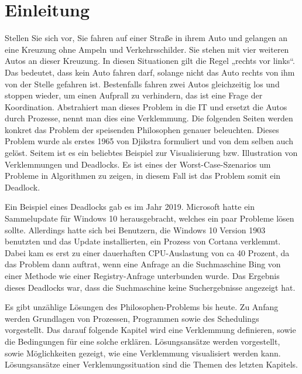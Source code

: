 \chapter{Einleitung}
\label{sec:Einleitung}
Stellen Sie sich vor, Sie fahren auf einer Straße in ihrem Auto und gelangen an eine Kreuzung ohne Ampeln und Verkehrsschilder. Sie stehen mit vier weiteren Autos an dieser Kreuzung. In diesen Situationen gilt die Regel „rechts vor links“. Das bedeutet, dass kein Auto fahren darf, solange nicht das Auto rechts von ihm von der Stelle gefahren ist. Bestenfalls fahren zwei Autos gleichzeitig los und stoppen wieder, um einen Aufprall zu verhindern, das ist eine Frage der Koordination.
Abstrahiert man dieses Problem in die IT und ersetzt die Autos durch Prozesse, nennt man dies eine Verklemmung.
Die folgenden Seiten werden konkret das Problem der speisenden Philosophen genauer beleuchten.
Dieses Problem wurde als erstes 1965 von Djikstra formuliert und von dem selben auch gelöst. Seitem ist es ein beliebtes Beispiel zur Visualisierung bzw. Illustration von Verklemmungen und Deadlocks. Es ist eines der Worst-Case-Szenarios um Probleme in Algorithmen zu zeigen, in diesem Fall ist das Problem somit ein Deadlock.

Ein Beispiel eines Deadlocks gab es im Jahr 2019. Microsoft hatte ein Sammelupdate für Windows 10 herausgebracht, welches ein paar Probleme lösen sollte. Allerdings hatte sich bei Benutzern, die Windows 10 Version 1903 benutzten und das Update installierten, ein Prozess von Cortana verklemmt. Dabei kam es erst zu einer dauerhaften CPU-Auslastung von  ca 40 Prozent, da das Problem dann auftrat, wenn eine Anfrage an die Suchmaschine Bing von einer Methode wie einer Registry-Anfrage unterbunden wurde. Das Ergebnis dieses Deadlocks war, dass die Suchmaschine keine Suchergebnisse angezeigt hat.\parencite[vgl.][]{bug}

Es gibt unzählige Lösungen des Philosophen-Problems bis heute. 
Zu Anfang werden Grundlagen von Prozessen, Programmen sowie des Schedulings vorgestellt. Das darauf folgende Kapitel wird eine Verklemmung definieren, sowie die Bedingungen für eine solche erklären. 
Lösungsansätze werden vorgestellt, sowie Möglichkeiten gezeigt, wie eine Verklemmung visualisiert werden kann. Lösungsansätze einer Verklemungssituation sind die Themen des letzten Kapitels.